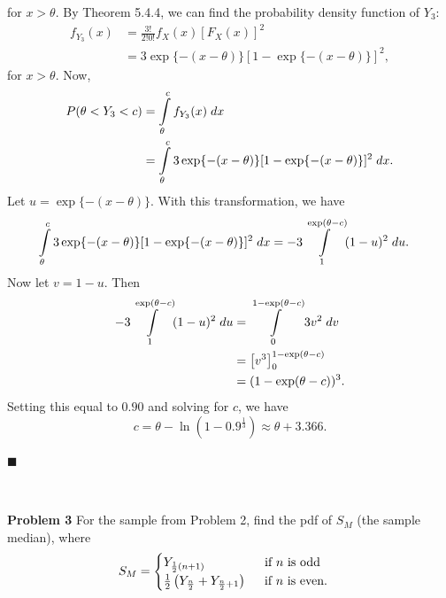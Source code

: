 \documentclass{article}
\newcommand{\mybox}{%
    \collectbox{%
        \setlength{\fboxsep}{1pt}%
        \fbox{\BOXCONTENT}%
    }%
}
\begin{document}
\noindent for $x>\theta$.  By Theorem 5.4.4, we can find the probability density function of $Y_3$:
\begin{align}
f_{Y_3}(x) &= \frac{3!}{2!0!}f_X(x)[F_X(x)]^2 \\
&= 3\exp\lbrace-(x-\theta)\rbrace[1 - \exp\lbrace-(x - \theta)\rbrace]^2,
\end{align}
\noindent for $x>\theta$.  Now, 
\begin{align}
P(\theta < Y_3 < c) &= \int\limits_{\theta}^c f_{Y_3}(x) \hspace{1mm} dx \\
&= \int\limits_{\theta}^c 3\exp\lbrace-(x-\theta)\rbrace[1 - \exp\lbrace-(x - \theta)\rbrace]^2 \hspace{1mm} dx.
\end{align}
\noindent Let $u = \exp\lbrace-(x-\theta)\rbrace$.  With this transformation, we have
\begin{align}
\int\limits_{\theta}^c 3\exp\lbrace-(x-\theta)\rbrace[1 - \exp\lbrace-(x - \theta)\rbrace]^2 \hspace{1mm} dx &= -3\int\limits_{1}^{\exp(\theta - c)} (1 - u)^2 \hspace{1mm} du.
\end{align}
\noindent Now let $v = 1 - u$.  Then
\begin{align}
-3\int\limits_{1}^{\exp(\theta - c)} (1 - u)^2 \hspace{1mm} du &= \int\limits_0^{1-\exp(\theta-c)}3v^2 \hspace{1mm} dv \\
&= \left[v^3\right]^{1-\exp(\theta-c)}_0 \\
&= (1-\exp(\theta-c))^3.
\end{align}
Setting this equal to $0.90$ and solving for $c$, we have $$c = \theta - \ln\left(1-0.9^{\frac{1}{3}}\right) \approx \theta + 3.366.$$

\vspace{-5mm}
\hfill$\blacksquare$

\begin{center}
\vspace{-0.4cm}
\hrulefill \\
\vspace{-0.7cm}
\hrulefill
\end{center}

\vspace{3mm}

\noindent\mybox{\textbf{Problem 3}}  For the sample from Problem 2, find the pdf of $S_M$ (the sample median), where
$$
S_M = 
\begin{cases}
Y_{\frac{1}{2}(n+1)} \hspace{17mm} \text{if } n \text{ is odd} \\
\frac{1}{2}\left(Y_{\frac{n}{2}} + Y_{\frac{n}{2}+1}\right) \hspace{5mm} \text{if } n \text{ is even.}
\end{cases}
$$
\end{document}

